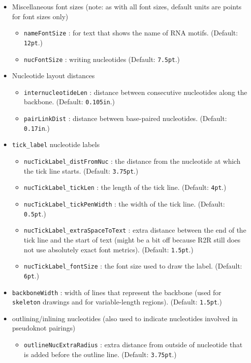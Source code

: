 \documentclass[letterpaper,12pt]{report}
\begin{document}
\begin{itemize}
\item Miscellaneous font sizes (note: as with all font sizes, default units are points for font sizes only)
	\begin{itemize}
	\item {\tt nameFontSize} : for text that shows the name of RNA motifs. (Default: {\tt 12pt}.)
	\item {\tt nucFontSize} : writing nucleotides (Default: {\tt 7.5pt}.)
	\end{itemize}
\item Nucleotide layout distances
	\begin{itemize}
	\item \label{internucleotideLen}{\tt internucleotideLen} : distance between consecutive nucleotides along the backbone.  (Default: {\tt 0.105in}.)
	\item {\tt pairLinkDist} : distance between base-paired nucleotides. (Default: {\tt 0.17in}.)
	\end{itemize}
\item {\tt tick\_label} nucleotide labels
	\begin{itemize}
	\item {\tt nucTickLabel\_distFromNuc} : the distance from the nucleotide at which the tick line starts. (Default: {\tt 3.75pt}.)
	\item {\tt nucTickLabel\_tickLen} : the length of the tick line. (Default: {\tt 4pt}.)
	\item {\tt nucTickLabel\_tickPenWidth} : the width of the tick line. (Default: {\tt 0.5pt}.)
	\item {\tt nucTickLabel\_extraSpaceToText} : extra distance between the end of the tick line and the start of text (might be a bit off because R2R still does not use absolutely exact font metrics). (Default: {\tt 1.5pt}.)
	\item {\tt nucTickLabel\_fontSize} : the font size used to draw the label. (Default: {\tt 6pt}.)
	\end{itemize}
\item {\tt backboneWidth} : width of lines that represent the backbone (used for {\tt skeleton} drawings and for variable-length regions). (Default: {\tt 1.5pt}.)
\item outlining/inlining nucleotides (also used to indicate nucleotides involved in pseudoknot pairings)
	\begin{itemize}
	\item {\tt outlineNucExtraRadius} : extra distance from outside of nucleotide that is added before the outline line. (Default: {\tt 3.75pt}.)

\end{itemize}
\end{itemize}
\end{document}
